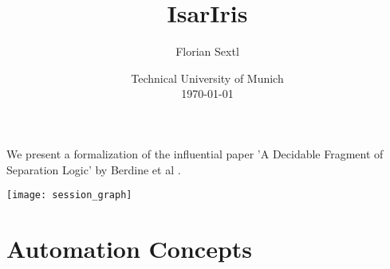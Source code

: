 \documentclass[11pt,a4paper]{article}
\begin{document}
\title{IsarIris}
\author{Florian Sextl}
\date{Technical University of Munich\\[\baselineskip] \today}
\maketitle

\tableofcontents

We present a formalization of the influential paper 'A Decidable Fragment of
  Separation Logic' by Berdine et al \cite{JoshBerdine.2004}.

\texttt{[image: session\_graph]}

\newpage

\section{Automation Concepts}
\end{document}
